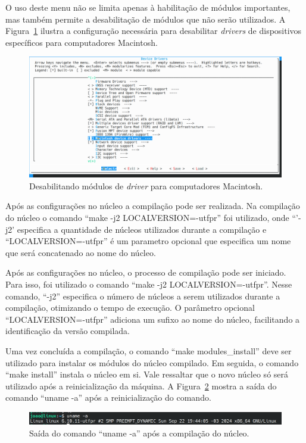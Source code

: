 \documentclass[
	12pt,				%
	oneside,   	        %
	a4paper,			%
	english,			%
	french,				%
	spanish,			%
	brazil,				%
	]{pacotes/abntex2}
\begin{document}
O uso deste menu não se limita apenas à habilitação de módulos importantes, mas também permite a desabilitação de módulos que não serão utilizados. A Figura~\ref{fig:macintosh} ilustra a configuração necessária para desabilitar \textit{drivers} de dispositivos específicos para computadores Macintosh.

\begin{figure}[H]
  \centering
  \includegraphics[scale=0.3]{figuras/macintosh.png}
  \caption{Desabilitando módulos de \textit{driver} para computadores Macintosh.}
  \label{fig:macintosh}
\end{figure}

Após as configurações no núcleo a compilação pode ser realizada. Na compilação do núcleo o comando ``make -j2 LOCALVERSION=-utfpr'' foi utilizado, onde ``'-j2' especifica a quantidade de núcleos utilizados durante a compilação e ``LOCALVERSION=-utfpr'' é um parametro opcional que especifica um nome que será concatenado ao nome do núcleo.

Após as configurações no núcleo, o processo de compilação pode ser iniciado. Para isso, foi utilizado o comando ``make -j2 LOCALVERSION=-utfpr''. Nesse comando, ``-j2'' especifica o número de núcleos a serem utilizados durante a compilação, otimizando o tempo de execução. O parâmetro opcional ``LOCALVERSION=-utfpr'' adiciona um sufixo ao nome do núcleo, facilitando a identificação da versão compilada.

Uma vez concluída a compilação, o comando ``make modules\_install'' deve ser utilizado para instalar os módulos do núcleo compilado. Em seguida, o comando ``make install'' instala o núcleo em si. Vale ressaltar que o novo núcleo só será utilizado após a reinicialização da máquina. A Figura~\ref{fig:uname_pos} mostra a saída do comando ``uname -a'' após a reinicialização do comando.

\begin{figure}[H]
  \centering
  \includegraphics[scale=0.3]{figuras/uname_pos.png}
  \caption{Saída do comando ``uname -a'' após a compilação do núcleo.}
  \label{fig:uname_pos}
\end{figure}
\end{document}
